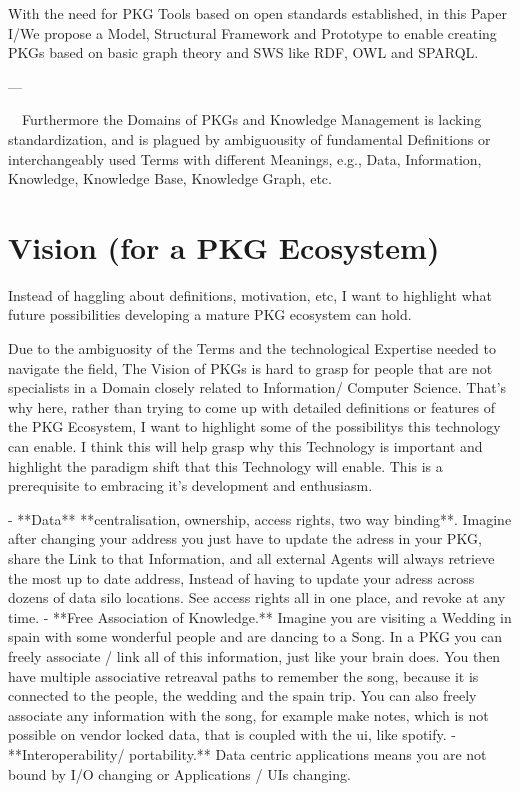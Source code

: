 With the need for PKG Tools based on open standards established, in this Paper I/We propose a Model, Structural Framework and Prototype to enable creating PKGs based on basic graph theory and SWS like RDF, OWL and SPARQL.

---

~~Furthermore the Domains of PKGs and Knowledge Management is lacking standardization, and is plagued by ambiguousity of fundamental Definitions or interchangeably used Terms with different Meanings, e.g., Data, Information, Knowledge, Knowledge Base, Knowledge Graph, etc.~~

\section{Vision (for a PKG Ecosystem)}

Instead of haggling about definitions, motivation, etc, I want to highlight what future possibilities developing a mature PKG ecosystem can hold.

Due to the ambiguosity of the Terms and the technological Expertise needed to navigate the field, The Vision of PKGs is hard to grasp for people that are not specialists in a Domain closely related to Information/ Computer Science. That’s why here, rather than trying to come up with detailed definitions or features of the PKG Ecosystem, I want to highlight some of the possibilitys this technology can enable. I think this will help grasp why this Technology is important and highlight the paradigm shift that this Technology will enable. This is a prerequisite to embracing it’s development and enthusiasm.

- **Data** **centralisation, ownership, access rights, two way binding**. Imagine after changing your address you just have to update the adress in your PKG, share the Link to that Information, and all external Agents will always retrieve the most up to date address, Instead of having to update your adress across dozens of data silo locations. See access rights all in one place, and revoke at any time.
- **Free Association of Knowledge.** Imagine you are visiting a Wedding in spain with some wonderful people and are dancing to a Song. In a PKG you can freely associate / link all of this information, just like your brain does. You  then have multiple associative retreaval paths to remember the song, because it is connected to the people, the wedding and the spain trip. You can also freely associate any information with the song, for example make notes, which is not possible on vendor locked data, that is coupled with the ui, like spotify.
- **Interoperability/ portability.** Data centric applications means you are not bound by I/O changing or Applications / UIs changing.

